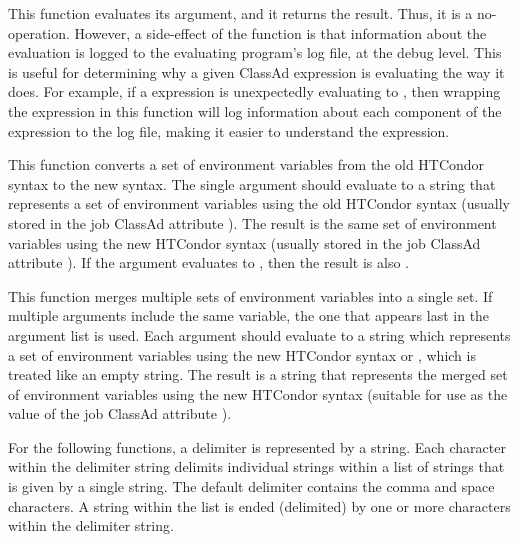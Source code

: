 \begin{description}
  \item[\Code{AnyType debug(AnyType expression)}]
     This function evaluates its argument, and it returns the result.
     Thus, it is a no-operation.
     However, a side-effect of the function is that information about
     the evaluation is logged to the evaluating program's log file,
     at the  debug level.
     This is useful for determining why a given ClassAd expression
     is evaluating the way it does.  
     For example, if a   expression
     is unexpectedly evaluating to ,
     then wrapping the expression in this  function will
     log information about each component of the expression to the log file,
     making it easier to understand the expression.

  \item[\Code{String envV1ToV2(String old\_env)}]
    This function converts a set of environment variables from the old
    HTCondor syntax to the new syntax.
    The single argument should evaluate to a string that represents a
    set of environment variables using the old HTCondor syntax
    (usually stored in the job ClassAd attribute ).
    The result is the same set of environment variables using the new
    HTCondor syntax (usually stored in the job ClassAd attribute
    ).
    If the argument evaluates to , then the result is
    also .

  \item[\Code{String mergeEnvironment(String env1 [ , String env2, ... ])}]
    This function merges multiple sets of environment variables into
    a single set.
    If multiple arguments include the same variable, the one that appears
    last in the argument list is used.
    Each argument should evaluate to a string which represents a set of
    environment variables using the new HTCondor syntax or ,
    which is treated like an empty string.
    The result is a string that represents the merged set of environment
    variables using the new HTCondor syntax (suitable for use as the value
    of the job ClassAd attribute ).

\end{description}

For the following functions, a delimiter is represented by a string.
Each character within the delimiter string
delimits individual strings within a list of strings 
that is given by a single string.
The default delimiter contains the comma and space characters.
A string within the list is ended (delimited) by one or more
characters within the delimiter string.

